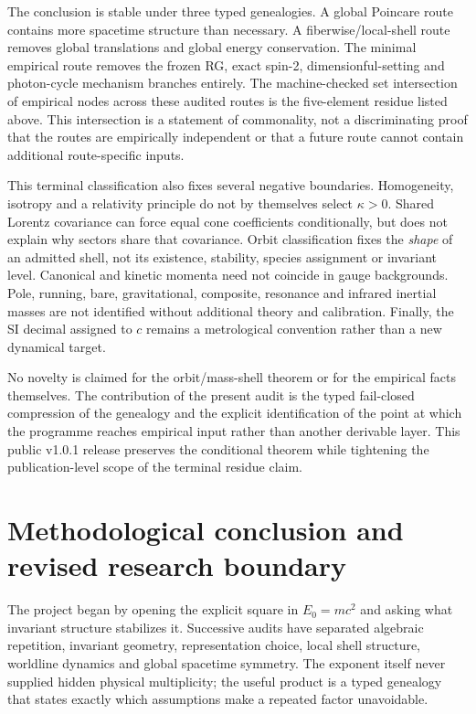 \documentclass[11pt,a4paper]{article}
\begin{document}
The conclusion is stable under three typed genealogies. A global Poincare route contains more spacetime structure than necessary. A fiberwise/local-shell route removes global translations and global energy conservation. The minimal empirical route removes the frozen RG, exact spin-2, dimensionful-setting and photon-cycle mechanism branches entirely. The machine-checked set intersection of empirical nodes across these audited routes is the five-element residue listed above. This intersection is a statement of commonality, not a discriminating proof that the routes are empirically independent or that a future route cannot contain additional route-specific inputs.

This terminal classification also fixes several negative boundaries. Homogeneity, isotropy and a relativity principle do not by themselves select $\kappa>0$. Shared Lorentz covariance can force equal cone coefficients conditionally, but does not explain why sectors share that covariance. Orbit classification fixes the \emph{shape} of an admitted shell, not its existence, stability, species assignment or invariant level. Canonical and kinetic momenta need not coincide in gauge backgrounds. Pole, running, bare, gravitational, composite, resonance and infrared inertial masses are not identified without additional theory and calibration. Finally, the SI decimal assigned to $c$ remains a metrological convention rather than a new dynamical target.

No novelty is claimed for the orbit/mass-shell theorem or for the empirical facts themselves. The contribution of the present audit is the typed fail-closed compression of the genealogy and the explicit identification of the point at which the programme reaches empirical input rather than another derivable layer.  This public v1.0.1 release preserves the conditional theorem while tightening the publication-level scope of the terminal residue claim.

\section{Methodological conclusion and revised research boundary}
The project began by opening the explicit square in $E_0=mc^2$ and asking what invariant structure stabilizes it.  Successive audits have separated algebraic repetition, invariant geometry, representation choice, local shell structure, worldline dynamics and global spacetime symmetry.  The exponent itself never supplied hidden physical multiplicity; the useful product is a typed genealogy that states exactly which assumptions make a repeated factor unavoidable.
\end{document}
